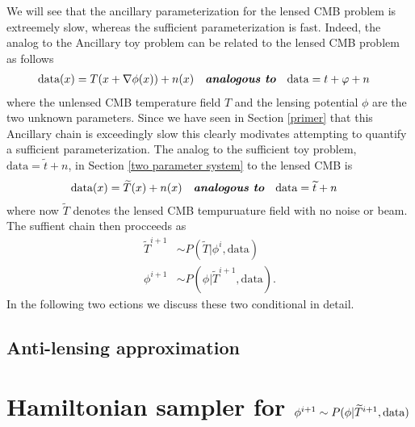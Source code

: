 \documentclass[noinfoline]{imsart}
\begin{document}
We will see that the ancillary parameterization for the lensed CMB problem is extreemely slow, whereas the sufficient parameterization is fast. Indeed, the analog to the Ancillary toy problem can be related to the lensed CMB problem as follows
\begin{align*}
  \text{data}(x) &= T(x+\nabla \phi(x)) + n(x)\quad\text{\bf\em analogous to}\quad
  \text{data} =  t +\varphi + n
\end{align*}
where the unlensed  CMB temperature field $T$ and the lensing potential $\phi$ are the two unknown parameters. Since we have seen in Section \ref{primer} that this Ancillary chain is exceedingly slow this clearly modivates attempting to quantify a sufficient parameterization. The analog to the sufficient toy problem, $\text{data} = \widetilde t + n$,  in Section \ref{two parameter system} to the lensed CMB is 
\begin{align*}
  \text{data}(x) &= \widetilde T(x) + n(x) \quad\text{\bf\em analogous to}\quad
  \text{data} =  \widetilde t + n
\end{align*}
where now $\widetilde T$ denotes the lensed CMB tempuruature field with no noise or beam.
The suffient chain then procceeds as
\begin{align}
\widetilde T^{i+1}&\sim P(\widetilde T |  \phi^{i},\text{data})\\
\phi^{i+1}&\sim P(\phi | \widetilde T^{i+1},  \text{data}).
\end{align}
In the following two ections we discuss these two conditional in detail.



\subsection{Anti-lensing approximation}


\section{Hamiltonian sampler for $\phi^{i+1}\sim P(\phi | \widetilde T^{i+1},  \text{\rm data})$}
\end{document}
